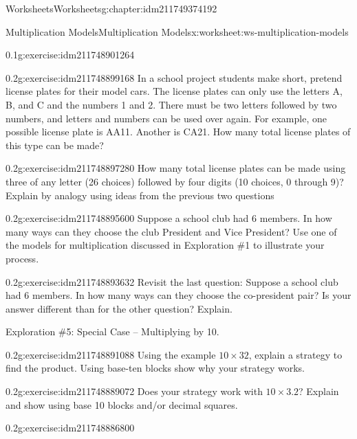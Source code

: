 \documentclass[twoside,11pt,]{book}
\begin{document}
\begin{chapterptx}{Worksheets}{}{Worksheets}{}{}{g:chapter:idm211749374192}
\begin{worksheet-section-numberless}{Multiplication Models}{}{Multiplication Models}{}{}{x:worksheet:ws-multiplication-models}
\begin{divisionexercise}{11}{}{0.1}{g:exercise:idm211748901264}
\end{divisionexercise}%
\clearpage
\begin{divisionexercise}{12}{}{0.2}{g:exercise:idm211748899168}%
In a school project students make short, pretend license plates for their model cars.  The license plates can only use the letters A, B, and C and the numbers 1 and 2.  There must be two letters followed by two numbers, and letters and numbers can be used over again.  For example, one possible license plate is AA11. Another is CA21. How many total license plates of this type can be made?%
\end{divisionexercise}%
\begin{divisionexercise}{13}{}{0.2}{g:exercise:idm211748897280}%
How many total license plates can be made using three of any letter (26 choices) followed by four digits (10 choices, 0 through 9)?  Explain by analogy using ideas from the previous two questions%
\end{divisionexercise}%
\begin{divisionexercise}{14}{}{0.2}{g:exercise:idm211748895600}%
Suppose a school club had 6 members. In how many ways can they choose the club President and Vice President? Use one of the models for multiplication discussed in Exploration \#1 to illustrate your process.%
\end{divisionexercise}%
\clearpage
\begin{divisionexercise}{15}{}{0.2}{g:exercise:idm211748893632}%
Revisit the last question: Suppose a school club had 6 members. In how many ways can they choose the co-president pair? Is your answer different than for the other question?  Explain.%
\end{divisionexercise}%
\begin{introduction}{}%
Exploration \#5: Special Case – Multiplying by 10.\end{introduction}%
\begin{divisionexercise}{16}{}{0.2}{g:exercise:idm211748891088}%
Using the example \(10 \times 32 \), explain a strategy to find the product. Using base-ten blocks show why your strategy works.%
\end{divisionexercise}%
\begin{divisionexercise}{17}{}{0.2}{g:exercise:idm211748889072}%
Does your strategy work with \(10 \times 3.2 \)? Explain and show using base 10 blocks and\slash{}or decimal squares.%
\end{divisionexercise}%
\clearpage
\begin{divisionexercise}{18}{}{0.2}{g:exercise:idm211748886800}%

\end{divisionexercise}
\end{worksheet-section-numberless}
\end{chapterptx}
\end{document}
